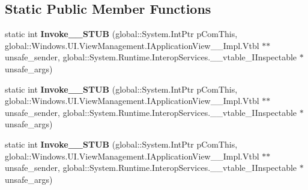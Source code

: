 \subsection*{Static Public Member Functions}
\begin{DoxyCompactItemize}
\item 
\mbox{\label{struct_windows_1_1_foundation_1_1_typed_event_handler___a___windows___u_i___view_management___apae42b7600dab322722f60f9705736124_a65a7b458d2f668d97ebb5a523cde9840}} 
static int {\bfseries Invoke\+\_\+\+\_\+\+S\+T\+UB} (global\+::\+System.\+Int\+Ptr p\+Com\+This, global\+::\+Windows.\+U\+I.\+View\+Management.\+I\+Application\+View\+\_\+\+\_\+\+Impl.\+Vtbl $\ast$$\ast$unsafe\+\_\+sender, global\+::\+System.\+Runtime.\+Interop\+Services.\+\_\+\+\_\+vtable\+\_\+\+I\+Inspectable $\ast$unsafe\+\_\+args)
\item 
\mbox{\label{struct_windows_1_1_foundation_1_1_typed_event_handler___a___windows___u_i___view_management___apae42b7600dab322722f60f9705736124_a65a7b458d2f668d97ebb5a523cde9840}} 
static int {\bfseries Invoke\+\_\+\+\_\+\+S\+T\+UB} (global\+::\+System.\+Int\+Ptr p\+Com\+This, global\+::\+Windows.\+U\+I.\+View\+Management.\+I\+Application\+View\+\_\+\+\_\+\+Impl.\+Vtbl $\ast$$\ast$unsafe\+\_\+sender, global\+::\+System.\+Runtime.\+Interop\+Services.\+\_\+\+\_\+vtable\+\_\+\+I\+Inspectable $\ast$unsafe\+\_\+args)
\item 
\mbox{\label{struct_windows_1_1_foundation_1_1_typed_event_handler___a___windows___u_i___view_management___apae42b7600dab322722f60f9705736124_a65a7b458d2f668d97ebb5a523cde9840}} 
static int {\bfseries Invoke\+\_\+\+\_\+\+S\+T\+UB} (global\+::\+System.\+Int\+Ptr p\+Com\+This, global\+::\+Windows.\+U\+I.\+View\+Management.\+I\+Application\+View\+\_\+\+\_\+\+Impl.\+Vtbl $\ast$$\ast$unsafe\+\_\+sender, global\+::\+System.\+Runtime.\+Interop\+Services.\+\_\+\+\_\+vtable\+\_\+\+I\+Inspectable $\ast$unsafe\+\_\+args)
\item 
\mbox{\label{struct_windows_1_1_foundation_1_1_typed_event_handler___a___windows___u_i___view_management___apae42b7600dab322722f60f9705736124_a65a7b458d2f668d97ebb5a523cde9840}} 
$$
\end{DoxyCompactItemize}

